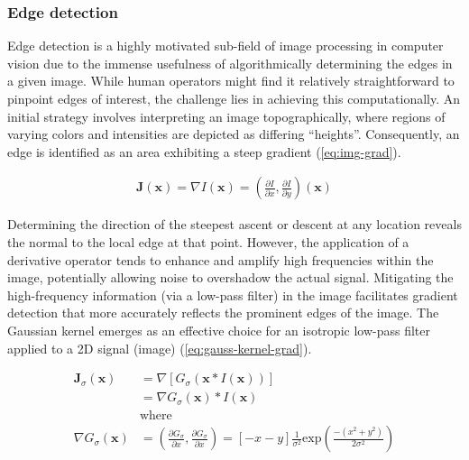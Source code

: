\subsubsection{Edge detection}
Edge detection is a highly motivated sub-field of image processing in computer vision due to the immense usefulness of algorithmically determining the edges in a given image.
While human operators might find it relatively straightforward to pinpoint edges of interest, the challenge lies in achieving this computationally.
An initial strategy involves interpreting an image topographically, where regions of varying colors and intensities are depicted as differing ``heights''.
Consequently, an edge is identified as an area exhibiting a steep gradient (\cref{eq:img-grad}).

\begin{equation}
    \begin{aligned}
        \mathbf{J}(\mathbf{x}) = \nabla I(\mathbf{x}) = (\frac{\partial I}{\partial x}, \frac{\partial I}{\partial y})(\mathbf{x})
    \end{aligned}
    \label{eq:img-grad}
\end{equation}

Determining the direction of the steepest ascent or descent at any location reveals the normal to the local edge at that point.
However, the application of a derivative operator tends to enhance and amplify high frequencies within the image, potentially allowing noise to overshadow the actual signal.
Mitigating the high-frequency information (via a low-pass filter) in the image facilitates gradient detection that more accurately reflects the prominent edges of the image.
The Gaussian kernel emerges as an effective choice for an isotropic low-pass filter applied to a 2D signal (image) (\cref{eq:gauss-kernel-grad}).

\begin{equation}
    \begin{aligned}
        \mathbf{J}_{\sigma}(\mathbf{x}) &= \nabla [G_\sigma (\mathbf{x} * I(\mathbf{x}))] \\
        &= \nabla G_\sigma (\mathbf{x}) * I(\mathbf{x}) \\
        &\text{where} \\
        \nabla G_\sigma (\mathbf{x}) &= (\frac{\partial G_{\sigma}}{\partial x}, \frac{\partial G_{\sigma}}{\partial x}) = [-x - y]\frac{1}{\sigma^{2}}\text{exp}(\frac{-(x^2 + y^2)}{2 \sigma^2})
    \end{aligned}
    \label{eq:gauss-kernel-grad}
\end{equation}


